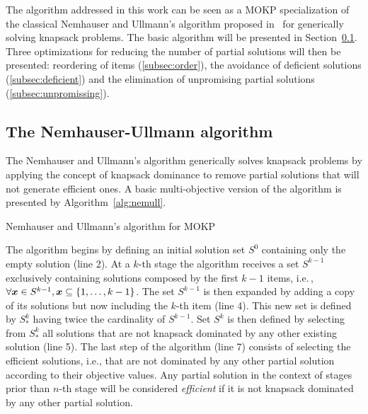
The algorithm addressed in this work
can be seen as a MOKP specialization of the classical Nemhauser
and Ullmann's algorithm proposed in~\cite{nemhauser1969discrete}
for generically solving knapsack problems.
The basic algorithm will be presented in Section~\ref{subsec:nu}.
Three optimizations for reducing the number of partial solutions will then be presented: reordering of items (\ref{subsec:order}), 
the avoidance of deficient solutions (\ref{subsec:deficient}) and
the elimination of unpromising partial solutions (\ref{subsec:unpromissing}).


\subsection{The Nemhauser-Ullmann algorithm}
\label{subsec:nu}

The Nemhauser and Ullmann's algorithm generically solves knapsack problems
by applying the concept of knapsack dominance to remove partial solutions that will
not generate efficient ones.
A basic multi-objective version of the algorithm is presented by Algorithm~\ref{alg:nemull}.

\begin{algorithm}
  \caption{Nemhauser and Ullmann's algorithm for MOKP}
  \label{alg:nemull}
  
\end{algorithm}

The algorithm begins by defining an initial solution set $S^0$ containing only
the empty solution (line 2).
At a $k$-th stage the algorithm receives a set $S^{k-1}$
exclusively containing solutions composed by the first ${k-1}$ items, i.e.\,,
$\forall\boldsymbol{x} \in S^{k-1}, \boldsymbol{x} \subseteq \{1, \ldots, k-1\}$.
The set $S^{k-1}$ is then expanded by adding a copy of its solutions
but now including the $k$-th item (line 4).
This new set is defined by $S^k_*$ having twice the cardinality of $S^{k-1}$.
Set $S^k$ is then defined by selecting from $S^k_*$ all solutions
that are not knapsack dominated by any other existing solution (line 5).
The last step of the algorithm (line 7) consists of selecting the
efficient solutions, i.e., that are not dominated by any other partial solution
according to their objective values.
Any partial solution in the context of stages prior than $n$-th stage
will be considered \emph{efficient} if it is not knapsack dominated by any other
partial solution.


